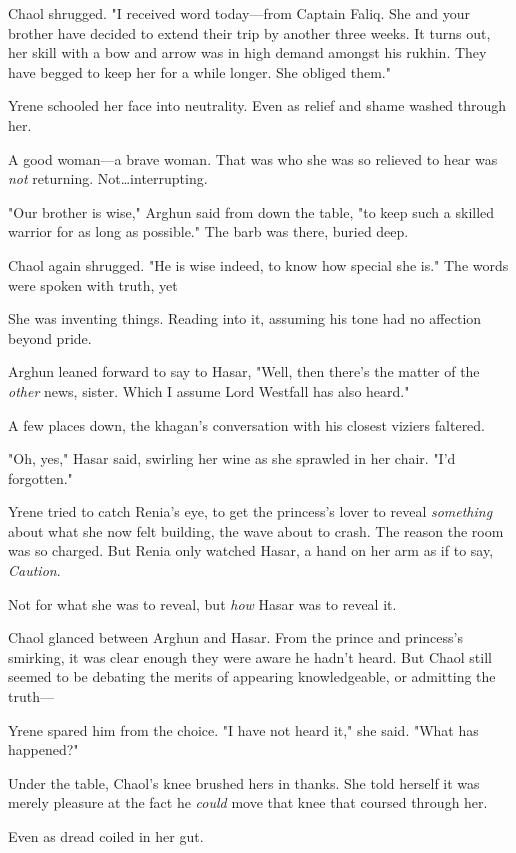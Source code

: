 Chaol shrugged.
"I received word today---from Captain Faliq.
She and your brother have decided to extend their trip by another three weeks.
It turns out, her skill with a bow and arrow was in high demand amongst his rukhin.
They have begged to keep her for a while longer.
She obliged them."

Yrene schooled her face into neutrality.
Even as relief and shame washed through her.

A good woman---a brave woman.
That was who she was so relieved to hear was \emph{not} returning.
Not\ldots interrupting.

"Our brother is wise," Arghun said from down the table, "to keep such a skilled warrior for as long as possible."
The barb was there, buried deep.

Chaol again shrugged.
"He is wise indeed, to know how special she is."
The words were spoken with truth, yet 

She was inventing things.
Reading into it, assuming his tone had no affection beyond pride.

Arghun leaned forward to say to Hasar, "Well, then there's the matter of the \emph{other} news, sister.
Which I assume Lord Westfall has also heard."

A few places down, the khagan's conversation with his closest viziers faltered.

"Oh, yes," Hasar said, swirling her wine as she sprawled in her chair.
"I'd forgotten."

Yrene tried to catch Renia's eye, to get the princess's lover to reveal \emph{something} about what she now felt building, the wave about to crash.
The reason the room was so charged.
But Renia only watched Hasar, a hand on her arm as if to say, \emph{Caution}.

Not for what she was to reveal, but \emph{how} Hasar was to reveal it.

Chaol glanced between Arghun and Hasar.
From the prince and princess's smirking, it was clear enough they were aware he hadn't heard.
But Chaol still seemed to be debating the merits of appearing knowledgeable, or admitting the truth---

Yrene spared him from the choice.
"I have not heard it," she said.
"What has happened?"

Under the table, Chaol's knee brushed hers in thanks.
She told herself it was merely pleasure at the fact he \emph{could} move that knee that coursed through her.

Even as dread coiled in her gut.

